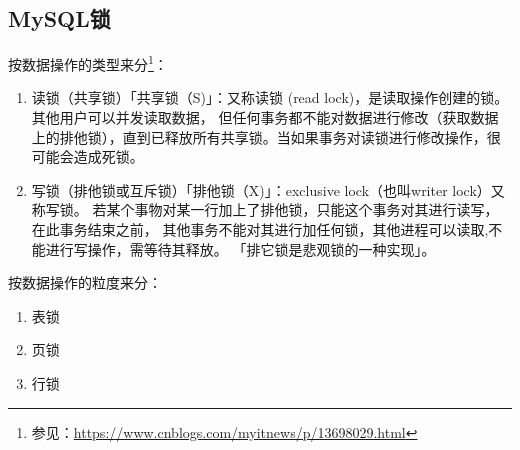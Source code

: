 \documentclass[../../../interview-questions.tex]{subfiles}
\begin{document}
\subsection{MySQL锁}

按数据操作的类型来分\footnote{参见：\url{https://www.cnblogs.com/myitnews/p/13698029.html}}：

\begin{enumerate}
    \item{读锁（共享锁）}「共享锁（S)」：又称读锁 (read lock)，是读取操作创建的锁。其他用户可以并发读取数据， 但任何事务都不能对数据进行修改（获取数据上的排他锁），直到已释放所有共享锁。当如果事务对读锁进行修改操作，很可能会造成死锁。
    \item{写锁（排他锁或互斥锁）}「排他锁（X)」：exclusive lock（也叫writer lock）又称写锁。 若某个事物对某一行加上了排他锁，只能这个事务对其进行读写，在此事务结束之前， 其他事务不能对其进行加任何锁，其他进程可以读取,不能进行写操作，需等待其释放。 「排它锁是悲观锁的一种实现」。
\end{enumerate}

按数据操作的粒度来分：

\begin{enumerate}
    \item{表锁}
    \item{页锁}
    \item{行锁}
\end{enumerate}
\end{document}

